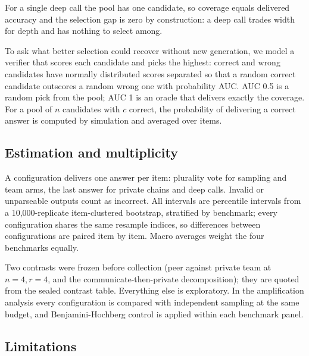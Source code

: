 \documentclass[11pt]{article}
\begin{document}
For a single deep call the pool has one candidate, so coverage equals delivered accuracy and the selection
gap is zero by construction: a deep call trades width for depth and has nothing to select among.

To ask what better selection could recover without new generation, we model a verifier that scores each
candidate and picks the highest: correct and wrong candidates have normally distributed scores separated so
that a random correct candidate outscores a random wrong one with probability AUC. AUC 0.5 is a random pick
from the pool; AUC 1 is an oracle that delivers exactly the coverage. For a pool of $n$ candidates with $c$
correct, the probability of delivering a correct answer is computed by simulation and averaged over items.

\subsection{Estimation and multiplicity}

A configuration delivers one answer per item: plurality vote for sampling and team arms, the last
answer for private chains and deep calls. Invalid or unparseable outputs count as incorrect. All
intervals are percentile intervals from a 10,000-replicate item-clustered bootstrap, stratified by
benchmark; every configuration shares the same resample indices, so differences between configurations
are paired item by item. Macro averages weight the four benchmarks equally.

Two contrasts were frozen before collection (peer against private team at $n=4, r=4$, and the
communicate-then-private decomposition); they are quoted from the sealed contrast table. Everything else
is exploratory. In the amplification analysis every configuration is compared with independent sampling
at the same budget, and Benjamini-Hochberg control is applied within each benchmark panel.

\subsection{Limitations}
\end{document}
